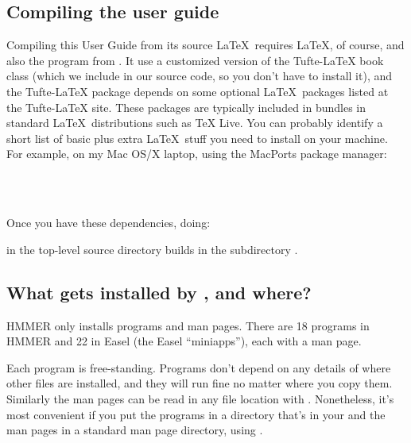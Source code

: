 \subsection{Compiling the user guide}

Compiling this User Guide from its source \LaTeX\ requires \LaTeX, of
course, and also the  program from
.
It use a customized version of the
Tufte-LaTeX book class
(which we include in our source code, so you don't have to
install it), and the Tufte-LaTeX package depends on some optional \LaTeX\ packages
listed at the
Tufte-LaTeX site.
These packages are typically included in bundles in
standard \LaTeX\ distributions such as
TeX Live.
You can probably
identify a short list of basic plus extra \LaTeX\ stuff you need to install on your machine. For
example, on my Mac OS/X laptop, using the MacPorts
package manager:

  \vspace{1ex}
  \\              
  \\
  \vspace{1ex}

Once you have these dependencies, doing:

  \vspace{1ex}
  \vspace{1ex}

in the top-level source directory builds 
in the subdirectory .


\subsection{What gets installed by , and where?}

HMMER only installs programs and man pages. There are 18 programs in
HMMER and 22 in Easel (the Easel ``miniapps''), each with a man page.

Each program is free-standing. Programs don't depend on any details of
where other files are installed, and they will run fine no matter
where you copy them.  Similarly the man pages can be read in any file
location with .  Nonetheless, it's
most convenient if you put the programs in a directory that's in your
 and the man pages in a standard man page directory, using
.

